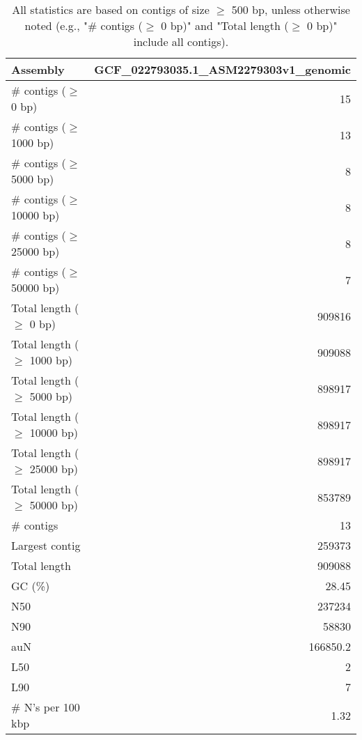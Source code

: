 \documentclass[12pt,a4paper]{article}
\begin{document}
\begin{table}[ht]
\begin{center}
\caption{All statistics are based on contigs of size $\geq$ 500 bp, unless otherwise noted (e.g., "\# contigs ($\geq$ 0 bp)" and "Total length ($\geq$ 0 bp)" include all contigs).}
\begin{tabular}{|l*{1}{|r}|}
\hline
Assembly & GCF\_022793035.1\_ASM2279303v1\_genomic \\ \hline
\# contigs ($\geq$ 0 bp) & 15 \\ \hline
\# contigs ($\geq$ 1000 bp) & 13 \\ \hline
\# contigs ($\geq$ 5000 bp) & 8 \\ \hline
\# contigs ($\geq$ 10000 bp) & 8 \\ \hline
\# contigs ($\geq$ 25000 bp) & 8 \\ \hline
\# contigs ($\geq$ 50000 bp) & 7 \\ \hline
Total length ($\geq$ 0 bp) & 909816 \\ \hline
Total length ($\geq$ 1000 bp) & 909088 \\ \hline
Total length ($\geq$ 5000 bp) & 898917 \\ \hline
Total length ($\geq$ 10000 bp) & 898917 \\ \hline
Total length ($\geq$ 25000 bp) & 898917 \\ \hline
Total length ($\geq$ 50000 bp) & 853789 \\ \hline
\# contigs & 13 \\ \hline
Largest contig & 259373 \\ \hline
Total length & 909088 \\ \hline
GC (\%) & 28.45 \\ \hline
N50 & 237234 \\ \hline
N90 & 58830 \\ \hline
auN & 166850.2 \\ \hline
L50 & 2 \\ \hline
L90 & 7 \\ \hline
\# N's per 100 kbp & 1.32 \\ \hline
\end{tabular}
\end{center}
\end{table}
\end{document}
